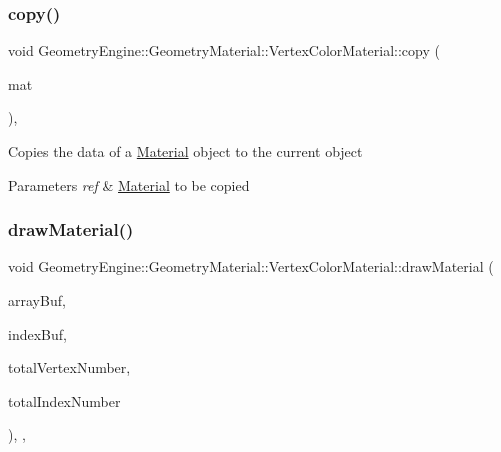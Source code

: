 \subsubsection{\texorpdfstring{copy()}{copy()}}
{\footnotesize\ttfamily void Geometry\+Engine\+::\+Geometry\+Material\+::\+Vertex\+Color\+Material\+::copy (\begin{DoxyParamCaption}\item[{const \mbox{\hyperlink{class_geometry_engine_1_1_geometry_material_1_1_vertex_color_material}{Vertex\+Color\+Material}} \&}]{mat }\end{DoxyParamCaption})\hspace{0.3cm}{\ttfamily [protected]}, {\ttfamily [virtual]}}

Copies the data of a \mbox{\hyperlink{class_geometry_engine_1_1_geometry_material_1_1_material}{Material}} object to the current object 
\begin{DoxyParams}{Parameters}
{\em ref} & \mbox{\hyperlink{class_geometry_engine_1_1_geometry_material_1_1_material}{Material}} to be copied \\
\hline
\end{DoxyParams}
\mbox{\label{class_geometry_engine_1_1_geometry_material_1_1_vertex_color_material_af03191da84c84c45af91405f3cba3b5d}} 
\subsubsection{\texorpdfstring{drawMaterial()}{drawMaterial()}}
{\footnotesize\ttfamily void Geometry\+Engine\+::\+Geometry\+Material\+::\+Vertex\+Color\+Material\+::draw\+Material (\begin{DoxyParamCaption}\item[{Q\+Open\+G\+L\+Buffer $\ast$}]{array\+Buf,  }\item[{Q\+Open\+G\+L\+Buffer $\ast$}]{index\+Buf,  }\item[{unsigned int}]{total\+Vertex\+Number,  }\item[{unsigned int}]{total\+Index\+Number }\end{DoxyParamCaption})\hspace{0.3cm}{\ttfamily [override]}, {\ttfamily [protected]}, {\ttfamily [virtual]}}

